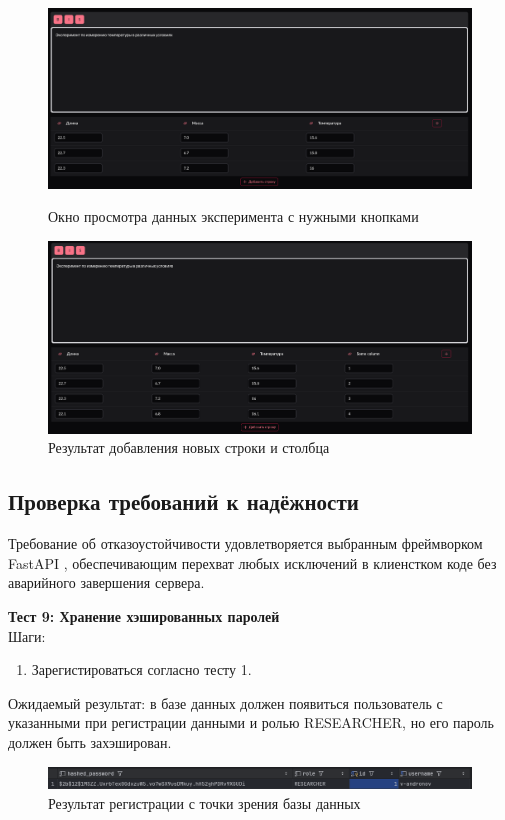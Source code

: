 \documentclass[a4paper,12pt,reqno]{article}
\begin{document}
    \begin{figure}[H]
        \centering
        \includegraphics[width=\linewidth]{img/experiment_view.png}
        \caption{Окно просмотра данных эксперимента с нужными кнопками}
        \includegraphics[width=\linewidth]{img/add_data_result.png}
        \caption{Результат добавления новых строки и столбца}
    \end{figure}
    \vspace{0.5cm}

    \subsection{Проверка требований к надёжности}

    Требование об отказоустойчивости удовлетворяется выбранным фреймворком FastAPI \cite{Framework:FastAPI}, обеспечивающим перехват любых исключений в клиенстком коде без аварийного завершения сервера.

    \textbf{Тест 9: Хранение хэшированных паролей}\\
    Шаги:
    \begin{enumerate}
        \item Зарегистироваться согласно тесту 1.
    \end{enumerate}
    Ожидаемый результат: в базе данных должен появиться пользователь с указанными при регистрации данными и ролью RESEARCHER, но его пароль должен быть захэширован.

    \begin{figure}[H]
        \centering
        \includegraphics[width=\linewidth]{img/hashed_password.png}
        \caption{Результат регистрации с точки зрения базы данных}
    \end{figure}
    \vspace{0.5cm}

    \newpage
    \printbibliography[title=Список источников, heading=bibintoc]

    \newpage
    \listRegistration
\end{document}
